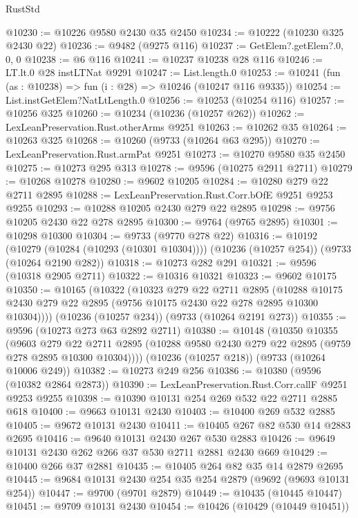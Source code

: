 \begin{lexlean}{RustStd}
\begin{coremodule}
@10230 := @10226 @9580 @2430 @35 @2450
@10234 := @10222 (@10230 @325 @2430 @22)
@10236 := @9482 (@9275 @116)
@10237 := GetElem?.getElem?.{0, 0, 0}
@10238 := @6 @116
@10241 := @10237 @10238 @28 @116
@10246 := LT.lt.{0} @28 instLTNat @9291
@10247 := List.length.{0}
@10253 := @10241 (fun (as : @10238) => fun (i : @28) => @10246 (@10247 @116 @9335))
@10254 := List.instGetElem?NatLtLength.{0}
@10256 := @10253 (@10254 @116)
@10257 := @10256 @325
@10260 := @10234 (@10236 (@10257 @262))
@10262 := LexLeanPreservation.Rust.otherArms @9251
@10263 := @10262 @35
@10264 := @10263 @325
@10268 := @10260 (@9733 (@10264 @63 @295))
@10270 := LexLeanPreservation.Rust.armPat @9251
@10273 := @10270 @9580 @35 @2450
@10275 := @10273 @295 @313
@10278 := @9596 (@10275 @2911 @2711)
@10279 := @10268 @10278
@10280 := @9602 @10205
@10284 := @10280 @279 @22 @2711 @2895
@10288 := LexLeanPreservation.Rust.Corr.bOfE @9251 @9253 @9255
@10293 := @10288 @10205 @2430 @279 @22 @2895
@10298 := @9756 @10205 @2430 @22 @278 @2895
@10300 := @9764 (@9765 @2895)
@10301 := @10298 @10300
@10304 := @9733 (@9770 @278 @22)
@10316 := @10192
    (@10279 (@10284 (@10293 (@10301 @10304))))
    (@10236 (@10257 @254))
    (@9733 (@10264 @2190 @282))
@10318 := @10273 @282 @291
@10321 := @9596 (@10318 @2905 @2711)
@10322 := @10316 @10321
@10323 := @9602 @10175
@10350 := @10165
    (@10322
      (@10323
        @279
        @22
        @2711
        @2895
        (@10288 @10175 @2430 @279 @22 @2895 (@9756 @10175 @2430 @22 @278 @2895 @10300 @10304))))
    (@10236 (@10257 @234))
    (@9733 (@10264 @2191 @273))
@10355 := @9596 (@10273 @273 @63 @2892 @2711)
@10380 := @10148
    (@10350
      @10355
      (@9603
        @279
        @22
        @2711
        @2895
        (@10288 @9580 @2430 @279 @22 @2895 (@9759 @278 @2895 @10300 @10304))))
    (@10236 (@10257 @218))
    (@9733 (@10264 @10006 @249))
@10382 := @10273 @249 @256
@10386 := @10380 (@9596 (@10382 @2864 @2873))
@10390 := LexLeanPreservation.Rust.Corr.callF @9251 @9253 @9255
@10398 := @10390 @10131 @254 @269 @532 @22 @2711 @2885 @618
@10400 := @9663 @10131 @2430
@10403 := @10400 @269 @532 @2885
@10405 := @9672 @10131 @2430
@10411 := @10405 @267 @82 @530 @14 @2883 @2695
@10416 := @9640 @10131 @2430 @267 @530 @2883
@10426 := @9649 @10131 @2430 @262 @266 @37 @530 @2711 @2881 @2430 @669
@10429 := @10400 @266 @37 @2881
@10435 := @10405 @264 @82 @35 @14 @2879 @2695
@10445 := @9684 @10131 @2430 @254 @35 @254 @2879 (@9692 (@9693 @10131 @254))
@10447 := @9700 (@9701 @2879)
@10449 := @10435 (@10445 @10447)
@10451 := @9709 @10131 @2430
@10454 := @10426 (@10429 (@10449 @10451))

\end{coremodule}
\end{lexlean}
